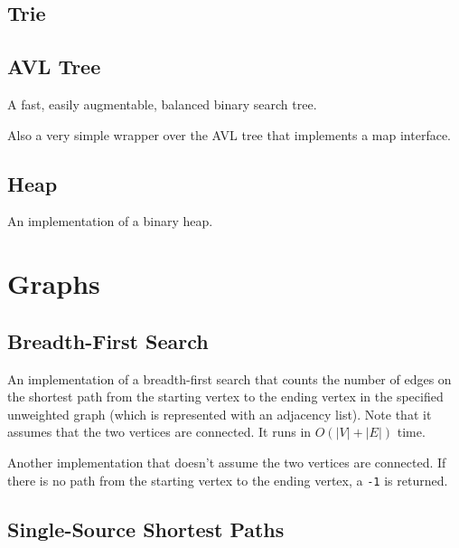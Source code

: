 \documentclass[10pt,a4paper,titlepage]{article}
\begin{document}
\subsection{Trie}


\subsection{AVL Tree}
A fast, easily augmentable, balanced binary search tree.


Also a very simple wrapper over the AVL tree that implements a map interface.


\subsection{Heap}
An implementation of a binary heap.


\section{Graphs}

\subsection{Breadth-First Search}

An implementation of a breadth-first search that counts the number of edges on the shortest path from the starting vertex to the ending vertex in the specified unweighted graph (which is represented with an adjacency list). Note that it assumes that the two vertices are connected. It runs in $O(|V|+|E|)$ time.


Another implementation that doesn't assume the two vertices are connected. If there is no path from the starting vertex to the ending vertex, a \lstinline$-1$ is returned.



\subsection{Single-Source Shortest Paths}
\end{document}
